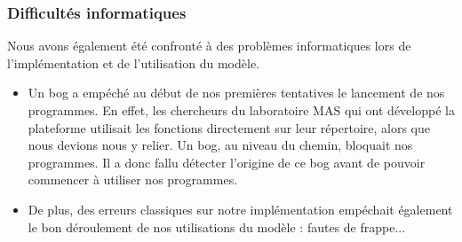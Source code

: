 \subsubsection{Difficultés informatiques}

Nous avons également été confronté à des problèmes informatiques lors de l'implémentation et de l'utilisation du modèle.
\begin{itemize}
	\item Un bog a empéché au début de nos premières tentatives le lancement de nos programmes. En effet, les chercheurs
du laboratoire MAS qui ont développé la plateforme utilisait les fonctions directement sur leur répertoire, alors que nous devions nous y relier. Un bog, au niveau du chemin, bloquait nos programmes. Il a donc fallu détecter l'origine de ce bog avant de pouvoir commencer à utiliser nos programmes. 
	
	\item De plus, des erreurs classiques sur notre implémentation empéchait également le bon déroulement de nos utilisations du modèle : fautes de frappe...

\end{itemize}
